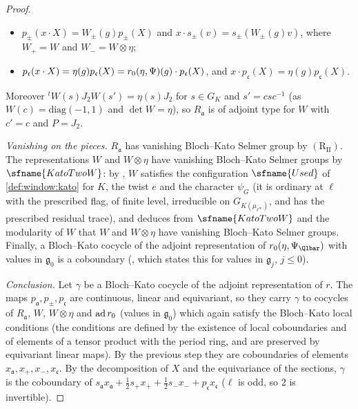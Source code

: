 \begin{proof}
\begin{itemize}
  so $R_{\mathfrak a}(g)Y=p_{\mathfrak a}(r(g)\cdot s_{\mathfrak a}Y)$ is a representation of $G_\Q$ on $M_2$, equal to $Y\mapsto W(g)YW(g)^{-1}$
  for $g\in G_K$ and to $Y\mapsto-J_2\,{}^tY\,J_2$ for $g=c$, where $J_2$ is the antidiagonal $2\times2$ matrix with entries $1$;
\item $p_\pm(x\cdot X)=W_\pm(g)p_\pm(X)$ and $x\cdot s_\pm(v)=s_\pm(W_\pm(g)v)$, where $W_+=W$ and $W_-=W\otimes\eta$;
\item $p_{\mathfrak c}(x\cdot X)=\eta(g)p_{\mathfrak c}(X)=r_0(\eta,\Psi)(g)\cdot p_{\mathfrak c}(X)$, and $x\cdot p_{\mathfrak c}(X)=\eta(g)p_{\mathfrak c}(X)$.
\end{itemize}
Moreover ${}^tW(s)J_2W(s')=\eta(s)J_2$ for $s\in G_K$ and $s'=csc^{-1}$ (as $W(c)=\mathrm{diag}(-1,1)$ and $\det W=\eta$), so $R_{\mathfrak a}$ is
of adjoint type for $W$ with $c'=c$ and $P=J_2$.

\emph{Vanishing on the pieces.} $R_{\mathfrak a}$ has vanishing Bloch--Kato Selmer group by $(\mathrm{R}_{\mathrm{II}})$. The
representations $W$ and $W\otimes\eta$ have vanishing Bloch--Kato Selmer groups by $\sfname{KatoTwoW}$: by
, $W$ satisfies the configuration $\sfname{Used}$ of \cref{def:window:kato} for $K$, the
twist $e$ and the character $\psi_G$ (it is ordinary at $\ell$ with the prescribed flag, of finite level, irreducible on
$G_{K(\mu_{\ell^\infty})}$, and has the prescribed residual trace), and 
deduces from $\sfname{KatoTwoW}$ and the modularity of $W$ that $W$ and $W\otimes\eta$ have vanishing Bloch--Kato Selmer groups.
Finally, a Bloch--Kato cocycle of the adjoint representation of $\eisrz(\eta,\Psi_{\Qlbar})$ with values in $\mathfrak g_0$ is a
coboundary (, which states this for values in $\mathfrak g_j$, $j\le0$).

\emph{Conclusion.} Let $\gamma$ be a Bloch--Kato cocycle of the adjoint representation of $r$. The maps $p_{\mathfrak a},p_\pm,p_{\mathfrak c}$
are continuous, linear and equivariant, so they carry $\gamma$ to cocycles of $R_{\mathfrak a}$, $W$, $W\otimes\eta$ and
$\mathrm{ad}\,r_0$ (values in $\mathfrak g_0$) which again satisfy the Bloch--Kato local conditions (the conditions are defined by
the existence of local coboundaries and of elements of a tensor product with the period ring, and are preserved by equivariant
linear maps). By the previous step they are coboundaries of elements $x_{\mathfrak a},x_+,x_-,x_{\mathfrak c}$. By the decomposition of
$X$ and the equivariance of the sections, $\gamma$ is the coboundary of
$s_{\mathfrak a}x_{\mathfrak a}+\tfrac12s_+x_++\tfrac12s_-x_-+p_{\mathfrak c}x_{\mathfrak c}$ ($\ell$ is odd, so $2$ is invertible).
\end{proof}

